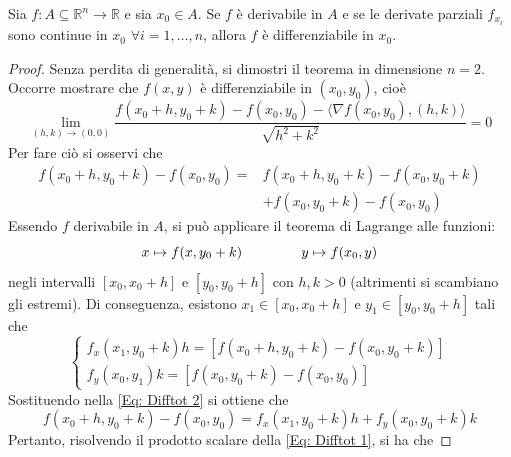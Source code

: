 \begin{theorem} \label{Teo: Differenziale totale}
    Sia $f:A \subseteq \mathbb{R}^n \to \mathbb{R}$ e sia $x_0 \in A$. Se $f$ è derivabile in $A$ e se le derivate parziali $f_{x_i}$ sono continue in $x_0$ $\forall i=1, \dots, n$, allora $f$ è differenziabile in $x_0$.
    \begin{proof}
        Senza perdita di generalità, si dimostri il teorema in dimensione $n=2$. Occorre mostrare che $f(x,y)$ è differenziabile in $(x_0, y_0)$, cioè
        \begin{equation} \label{Eq: Difftot 1}
            \lim_{(h,k) \to (0,0)} \frac{f(x_0+h, y_0+k)-f(x_0, y_0)-\langle\nabla f(x_0, y_0), (h,k)\rangle}{\sqrt{h^2+k^2}}=0
        \end{equation}
        Per fare ciò si osservi che
        \begin{equation} \label{Eq: Difftot 2}
            \begin{aligned}
                f(x_0+h, y_0+k)-f(x_0, y_0)=&f(x_0+h, y_0+k)-f(x_0, y_0+k)\\&+f(x_0, y_0+k)-f(x_0, y_0)
            \end{aligned}
        \end{equation}
        Essendo $f$ derivabile in $A$, si può applicare il teorema di Lagrange alle funzioni:
        \begin{equation}
            x \mapsto f(x, y_0+k) \hspace{1.5cm} y \mapsto f(x_0, y)
        \end{equation}
        negli intervalli $[x_0, x_0+h]$ e $[y_0, y_0+h]$ con $h,k>0$ (altrimenti si scambiano gli estremi).
        Di conseguenza, esistono $x_1 \in [x_0, x_0+h] $ e $y_1 \in [y_0, y_0+h]$ tali che
        \begin{equation}
            \begin{cases}
                f_x(x_1, y_0+k)h=\left[f(x_0+h, y_0+k)-f(x_0, y_0+k)\right]\\
                f_y(x_0, y_1)k=\left[f(x_0, y_0+k)-f(x_0, y_0) \right]
            \end{cases}
        \end{equation}
        Sostituendo nella \eqref{Eq: Difftot 2} si ottiene che
        \begin{equation} \label{Eq: Difftot 3}
            f(x_0+h, y_0+k)-f(x_0, y_0)=f_x(x_1, y_0+k)h+f_y(x_0, y_0+k)k
        \end{equation}
        Pertanto, risolvendo il prodotto scalare della \eqref{Eq: Difftot 1}, si ha che

\end{proof}
\end{theorem}
